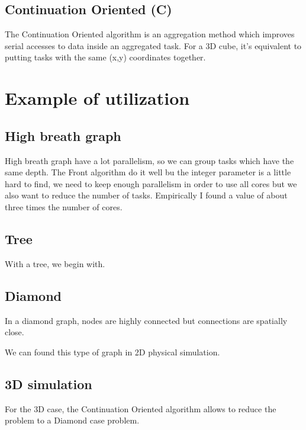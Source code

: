 \subsection{Continuation Oriented (C)}
The Continuation Oriented algorithm is an aggregation method which improves
serial accesses to data inside an aggregated task. For a 3D cube,
it's equivalent to putting tasks with the same (x,y) coordinates together.





\section{Example of utilization}
\subsection{High breath graph}
High breath graph have a lot parallelism, so we can group tasks which have the same depth.
The Front algorithm do it well bu the integer parameter is a little hard to find, we need
to keep enough parallelism in order to use all cores but we also want to reduce the number
of tasks.
Empirically I found a value of about three times the number of cores.

\subsection{Tree}
With a tree, we begin with.

\subsection{Diamond}
In a diamond graph, nodes are highly connected but connections are spatially close.


We can found this type of graph in 2D physical simulation.

\subsection{3D simulation}
For the 3D case, the Continuation Oriented algorithm allows to reduce the problem to a Diamond case problem.
